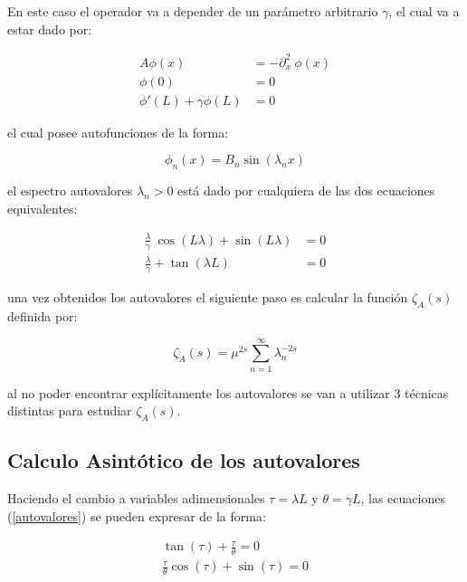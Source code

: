 En este caso el operador va a depender de un parámetro arbitrario $\gamma$, el cual va a estar dado por:

\begin{equation}
\begin{aligned}
    A \phi (x) &= - \partial ^2 _x \ \phi (x)  \\[5pt]
    \phi (0) &= 0 \\[5pt]
    \phi ' (L) + \gamma \phi (L) &= 0
\end{aligned}
\end{equation}

el cual posee autofunciones de la forma:

\begin{equation}
\phi _n (x) = 
B _n \sin ( \lambda _n x )
\end{equation}

el espectro autovalores $\lambda _n > 0 $ está dado por  cualquiera de las dos ecuaciones equivalentes: 

\begin{equation}
\begin{aligned}
    \frac{\lambda}{\gamma}  \ \cos( L \lambda ) +   \sin( L \lambda ) &= 0 \\[5pt]
    \frac{\lambda}{\gamma}  + \tan (\lambda L )  &= 0 
\label{autovalores}
\end{aligned}
\end{equation}



una vez obtenidos los autovalores el siguiente paso es calcular la función $\zeta _A (s) $ definida por:

\begin{equation}
    \zeta _ {A } (s) = \mu ^{2s} \sum_{n = 1} ^{ \infty } \lambda _n ^ {-2 s}
\end{equation}

al no poder encontrar explícitamente los autovalores se van a utilizar 3 técnicas distintas para estudiar $\zeta _A (s)$.

\subsection{Calculo Asintótico de los autovalores}


Haciendo el cambio a variables adimensionales $\tau = \lambda L $ y $\theta = \gamma L $, las ecuaciones (\ref{autovalores}) se pueden expresar de la forma:

\begin{equation}
\begin{array}{c}
    \tan (\tau) + \frac{\tau}{\theta} = 0 \\[5pt]
    \frac{\tau}{\theta} \cos( \tau ) + \sin( \tau ) = 0
\end{array}
\label{eq.asintota}
\end{equation}

